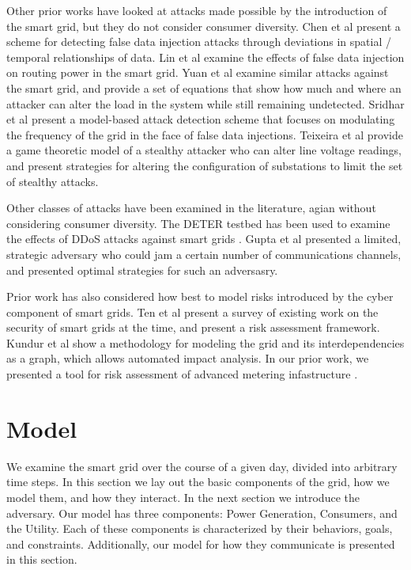 \documentclass[conference]{IEEEtran}
\begin{document}
Other prior works have looked at attacks made possible by the introduction of the smart grid, but they do not consider consumer diversity. Chen et al \cite{chen2015detection} present a scheme for detecting false data injection attacks through deviations in spatial / temporal relationships of data. Lin et al \cite{lin2012false} examine the effects of false data injection on routing power in the smart grid. Yuan et al \cite{yuan2011modeling} examine similar attacks against the smart grid, and provide a set of equations that show how much and where an attacker can alter the load in the system while still remaining undetected. Sridhar et al \cite{sridhar2014model} present a model-based attack detection scheme that focuses on modulating the frequency of the grid in the face of false data injections. Teixeira et al \cite{teixeira2014security} provide a game theoretic model of a stealthy attacker who can alter line voltage readings, and present strategies for altering the configuration of substations to limit the set of stealthy attacks. 

Other classes of attacks have been examined in the literature, agian without considering consumer diversity. The DETER testbed has been used to examine the effects of DDoS attacks against smart grids \cite{hussain2012ncs}. Gupta et al \cite{gupta2010optimal} presented a limited, strategic adversary who could jam a certain number of communications channels, and presented optimal strategies for such an adversasry. 

Prior work has also considered how best to model risks introduced by the cyber component of smart grids. Ten et al \cite{ten2010cybersecurity} present a survey of existing work on the security of smart grids at the time, and present a risk assessment framework. Kundur et al \cite{kundur2010towards} show a methodology for modeling the grid and its interdependencies as a graph, which allows automated impact analysis. In our prior work, we presented a tool for risk assessment of advanced metering infastructure \cite{shawly2014risk}.

\section{Model}
\label{Model}

We examine the smart grid over the course of a given day, divided into arbitrary time steps. In this section we lay out the basic components of the grid, how we model them, and how they interact. In the next section we introduce the adversary. Our model has three components: Power Generation, Consumers, and the Utility. Each of these components is characterized by their behaviors, goals, and constraints. Additionally, our model for how they communicate is presented in this section. 
\end{document}
